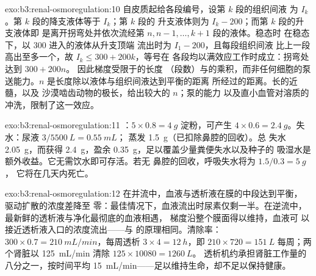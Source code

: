 \begin{solution}{exo:b3:renal-osmoregulation:10}
自皮质起给各段编号，设第 $k$ 段的组织间液
为 $I_{k}$。第 $k$ 段的降支液体等于 $I_{k}$；第 $k$ 段的
升支液体则为 $I_{k} - 200$；而第 $k$ 段的升支液体即
是离开拐弯处并依次流经第 $n, n-1, \dots, k+1$ 段的液体。稳态时
在稳态下，以 \qty{300}{} 进入的液体从升支顶端
流出时为 $I_{1} - 200$，且每段组织间液
比上一段高出至多一个，故 $I_{k} \le 300 + 200k$，等号在
各段均以满效应工作时成立：拐弯处达到 $300 + 200n$。
因此梯度受限于的长度
（段数）与的乘积，而非任何细胞的泵送能力。$n$
是长度除以液体与组织间液达到平衡的距离
所经过的距离。长的近髓，以及
沙漠啮齿动物的极长，给出较大的 $n$；泵的能力
以及直小血管对溶质的冲洗，限制了这一效应。
\end{solution}

\begin{solution}{exo:b3:renal-osmoregulation:11}
：$5\times 0.8 = \qty{4}{g}$ 淀粉，可产生 $4\times 0.6
= \qty{2.4}{g}$。失水：尿液 $3/5500\ \unit{L} = \qty{0.55}{mL}$；
蒸发 \qty{1.5}{g}（已扣除鼻腔的回收）。总
失水 \qty{2.05}{g}，而获得 \qty{2.4}{g}，盈余
\qty{0.35}{g}，足以覆盖少量粪便失水以及种子的
吸湿水是额外收益。它无需饮水即可存活。若无
鼻腔的回收，呼吸失水将为 $1.5/0.3 = \qty{5}{g}$，
它将在几天内死亡。
\end{solution}

\begin{solution}{exo:b3:renal-osmoregulation:12}
在并流中，血液与透析液在膜的中段达到平衡，
驱动扩散的浓度差降至
零：最佳情况下，血液流出时尿素仅剩一半。在逆流中，
最新鲜的透析液与净化最彻底的血液相遇，
梯度沿整个膜面得以维持，血液可
以接近透析液入口的浓度流出——与
的原理相同。清除率：$300\times 0.7 =
\qty{210}{mL/min}$，每周透析 $3\times 4 = \qty{12}{h}$，即
$210\times 720 = \qty{151}{L}$ 每周；两个肾脏以
\qty{125}{mL/min} 清除 $125\times\num{10080} = \qty{1260}{L}$。
透析机约承担肾脏工作量的八分之一，按时间平均
\qty{15}{mL/min}——足以维持生命，却不足以保持健康。
\end{solution}

